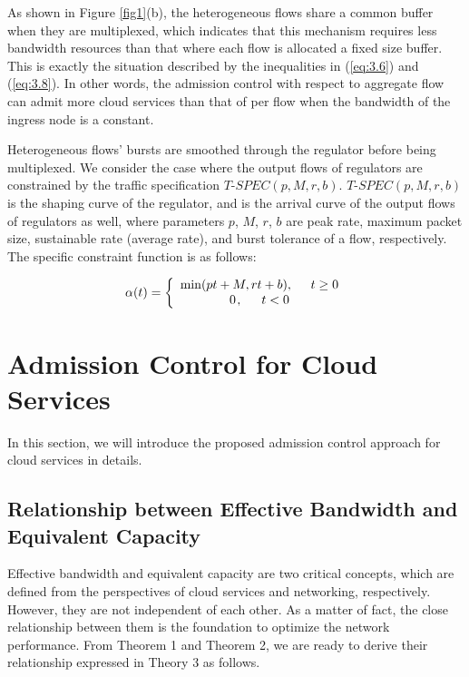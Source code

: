 \documentclass[a4paper]{article}
\begin{document}
As shown in Figure \ref{fig1}(b), the heterogeneous flows share a common buffer when they are multiplexed, which indicates that this mechanism requires less bandwidth resources than that where each flow is allocated a fixed size buffer. This is exactly the situation described by the inequalities in (\ref{eq:3.6}) and (\ref{eq:3.8}). In other words, the admission control with respect to aggregate flow can admit more cloud services than that of per flow when the bandwidth of the ingress node is a constant.

Heterogeneous flows’ bursts are smoothed through the regulator before being multiplexed. We consider the case where the output flows of regulators are constrained by the traffic specification $T$-$SPEC (p, M, r, b)$. $T$-$SPEC (p, M, r, b)$ is the shaping curve of the regulator, and is the arrival curve of the output flows of regulators as well, where parameters $p$, $M$, $r$, $b$ are peak rate, maximum packet size, sustainable rate (average rate), and burst tolerance of a flow, respectively. The specific constraint function is as follows:

\begin{equation}\label{eq:4.12}
  \alpha (t) = \left\{ {\begin{array}{*{20}{c}}
  {\min (pt + M,rt + b),{\kern 1pt} {\kern 1pt} {\kern 1pt} {\kern 1pt} {\kern 1pt} {\kern 1pt} {\kern 1pt} {\kern 1pt} {\kern 1pt} {\kern 1pt} {\kern 1pt} {\kern 1pt} {\kern 1pt} {\kern 1pt} t \ge 0}\\
  {0{\kern 1pt} ,{\kern 1pt} {\kern 1pt} {\kern 1pt} {\kern 1pt} {\kern 1pt} {\kern 1pt} {\kern 1pt} {\kern 1pt} {\kern 1pt} {\kern 1pt} {\kern 1pt} {\kern 1pt} {\kern 1pt} {\kern 1pt} {\kern 1pt} t < 0}
\end{array}} \right.
\end{equation}


\section{Admission Control for Cloud Services}

In this section, we will introduce the proposed admission control approach for cloud services in details.

\subsection{Relationship between Effective Bandwidth and Equivalent Capacity}

Effective bandwidth and equivalent capacity are two critical concepts, which are defined from the perspectives of cloud services and networking, respectively. However, they are not independent of each other. As a matter of fact, the close relationship between them is the foundation to optimize the network performance. From Theorem 1 and Theorem 2, we are ready to derive their relationship expressed in Theory 3 as follows.
\end{document}
